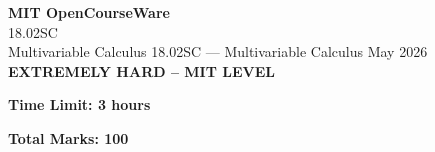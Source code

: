 \documentclass[12pt,a4paper]{exam}
\begin{document}
\begin{center}
{\LARGE \textbf{MIT OpenCourseWare}}\\18.02SC\\Multivariable Calculus
\vspace{0.5cm}
{18.02SC} --- {Multivariable Calculus}
\vspace{0.3cm}
May 2026
\vspace{0.3cm}
\textbf{EXTREMELY HARD -- MIT LEVEL}
\end{center}

\begin{center}
\textbf{Time Limit: 3 hours}
\end{center}

\begin{center}
\textbf{Total Marks: 100}
\end{center}

\vspace{0.5cm}
\end{document}
